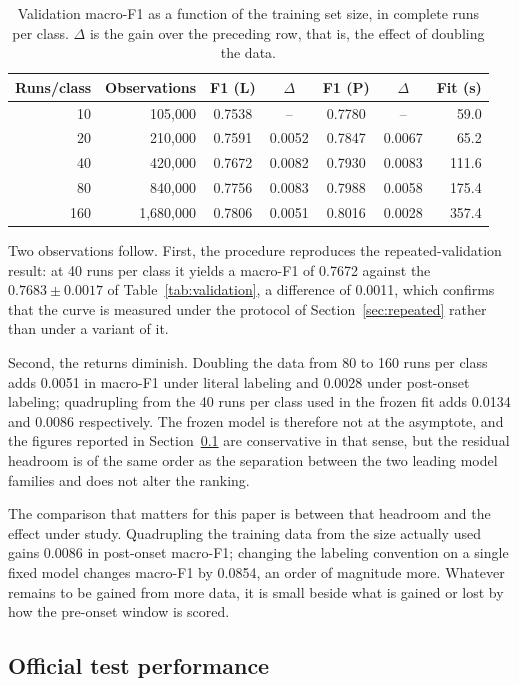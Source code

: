 \documentclass[10pt,twocolumn,a4paper]{article}
\begin{document}
\begin{table}[t]
\centering
\caption{Validation macro-F1 as a function of the training set size, in
complete runs per class. $\Delta$ is the gain over the preceding row, that is,
the effect of doubling the data.}
\label{tab:learning}
\small
\begin{tabular}{rrccccr}
\toprule
Runs/class & Observations & F1 (L) & $\Delta$ & F1 (P) & $\Delta$ & Fit (s)\\
\midrule
10  & 105,000   & 0.7538 & --      & 0.7780 & --      & 59.0\\
20  & 210,000   & 0.7591 & 0.0052 & 0.7847 & 0.0067 & 65.2\\
40  & 420,000   & 0.7672 & 0.0082 & 0.7930 & 0.0083 & 111.6\\
80  & 840,000   & 0.7756 & 0.0083 & 0.7988 & 0.0058 & 175.4\\
160 & 1,680,000 & 0.7806 & 0.0051 & 0.8016 & 0.0028 & 357.4\\
\bottomrule
\end{tabular}
\end{table}

Two observations follow. First, the procedure reproduces the repeated-validation
result: at 40 runs per class it yields a macro-F1 of 0.7672 against the
$0.7683\pm0.0017$ of Table~\ref{tab:validation}, a difference of 0.0011, which
confirms that the curve is measured under the protocol of Section~\ref{sec:repeated}
rather than under a variant of it.

Second, the returns diminish. Doubling the data from 80 to 160 runs per class
adds 0.0051 in macro-F1 under literal labeling and 0.0028 under post-onset
labeling; quadrupling from the 40 runs per class used in the frozen fit adds
0.0134 and 0.0086 respectively. The frozen model is therefore not at the
asymptote, and the figures reported in Section~\ref{sec:testperf} are
conservative in that sense, but the residual headroom is of the same order as
the separation between the two leading model families and does not alter the
ranking.

The comparison that matters for this paper is between that headroom and the
effect under study. Quadrupling the training data from the size actually used
gains 0.0086 in post-onset macro-F1; changing the labeling convention on a
single fixed model changes macro-F1 by 0.0854, an order of magnitude more.
Whatever remains to be gained from more data, it is small beside what is
gained or lost by how the pre-onset window is scored.

\subsection{Official test performance}
\label{sec:testperf}
\end{document}
